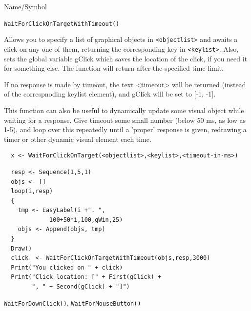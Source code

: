 \begin{desc}{Name/Symbol}
\item[Name/Symbol]  	\verb+WaitForClickOnTargetWithTimeout()+

\item[Description]	
  Allows you to specify a list of graphical objects in \verb+<objectlist>+ and awaits a click
  on any one of them, returning the corresponding key in \verb+<keylist>+.  Also, sets the 
  global variable gClick which saves the location of the click, if 
  you need it for something else.  The function will return after the specified time limit.

  If no response is made by timeout, the text <timeout> will be returned (instead of the correspnoding keylist element),
and gClick will be set to [-1, -1].

This function can also be useful to dynamically update some visual object while waiting for
a response.  Give timeout some small number (below 50 ms, as low as 1-5), and loop over this
repeatedly until a 'proper' response is given, redrawing a timer or other dynamic visual element
each time.

\item[Usage]		
\begin{verbatim}
  x <- WaitForClickOnTarget(<objectlist>,<keylist>,<timeout-in-ms>)
\end{verbatim}

\item[Example]	

\begin{verbatim}
  resp <- Sequence(1,5,1)
  objs <- []
  loop(i,resp)
  {
    tmp <- EasyLabel(i +". ",
             100+50*i,100,gWin,25)
    objs <- Append(objs, tmp)
  }
  Draw()
  click  <- WaitForClickOnTargetWithTimeout(objs,resp,3000)
  Print("You clicked on " + click)
  Print("Click location: [" + First(gClick) + 
        ", " + Second(gClick) + "]")
\end{verbatim}
\item[See Also]	
  \verb+WaitForDownClick()+, \verb+WaitForMouseButton()+
\end{desc}





